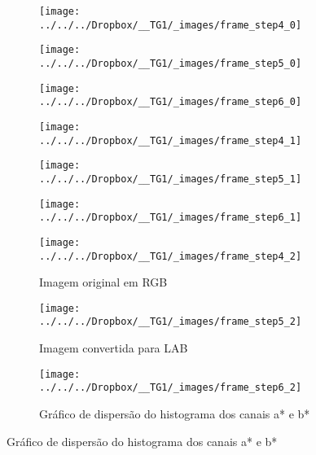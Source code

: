 \documentclass[ecp,tc]{iiufrgs}
\begin{document}
\begin{figure}
	\centering
	\caption{Sequência para cálculo de histograma: Carros}
	\begin{subfigure}[b]{0.3\textwidth}
		\texttt{[image: ../../../Dropbox/\_\_TG1/\_images/frame\_step4\_0]}
		\label{}
	\end{subfigure}
	\quad
	\begin{subfigure}[b]{0.3\textwidth}
		\texttt{[image: ../../../Dropbox/\_\_TG1/\_images/frame\_step5\_0]}
		\label{}
	\end{subfigure}
	\quad
	\begin{subfigure}[b]{0.3\textwidth}
		\texttt{[image: ../../../Dropbox/\_\_TG1/\_images/frame\_step6\_0]}
		\label{}
	\end{subfigure}
	\hfill
	\begin{subfigure}[b]{0.3\textwidth}
		\texttt{[image: ../../../Dropbox/\_\_TG1/\_images/frame\_step4\_1]}
		\label{}
	\end{subfigure}
	\quad
	\begin{subfigure}[b]{0.3\textwidth}
		\texttt{[image: ../../../Dropbox/\_\_TG1/\_images/frame\_step5\_1]}
		\label{}
	\end{subfigure}
	\quad
	\begin{subfigure}[b]{0.3\textwidth}
		\texttt{[image: ../../../Dropbox/\_\_TG1/\_images/frame\_step6\_1]}
		\label{}
	\end{subfigure}
	\hfill
	\begin{subfigure}[b]{0.3\textwidth}
		\texttt{[image: ../../../Dropbox/\_\_TG1/\_images/frame\_step4\_2]}
		\label{}
		\caption{Imagem original em RGB \linebreak}
	\end{subfigure}
	\quad
	\begin{subfigure}[b]{0.3\textwidth}
		\texttt{[image: ../../../Dropbox/\_\_TG1/\_images/frame\_step5\_2]}
		\label{}
		\caption{Imagem convertida para LAB}
	\end{subfigure}
	\quad
	\begin{subfigure}[b]{0.3\textwidth}
		\texttt{[image: ../../../Dropbox/\_\_TG1/\_images/frame\_step6\_2]}
		\label{}
		\caption{Gráfico de dispersão do histograma dos canais a* e b*}
	\end{subfigure}
	\label{fig:histcar}
\end{figure}
\end{document}
